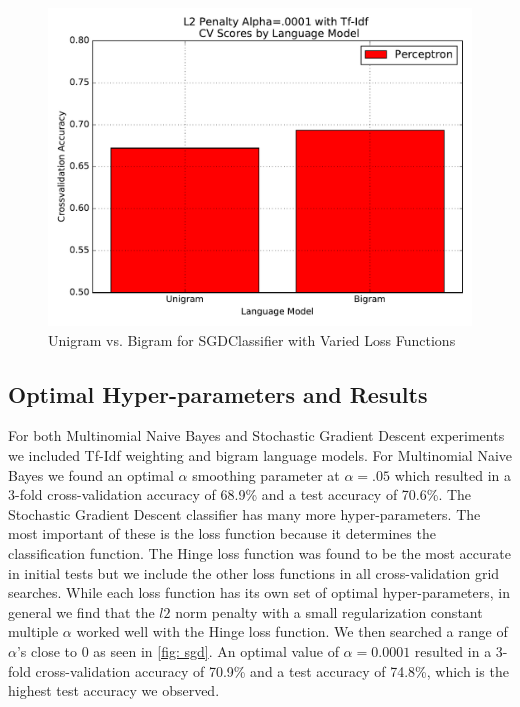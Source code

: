 \documentclass[a4paper, 12pt]{article}
\begin{document}
\begin{figure}[!htb]
  \includegraphics[width=\linewidth]{FiguresSVM_bigram_perceptron.pdf}
\endminipage
\caption[Unigram vs. Bigram for SGDClassifier with Varied Loss Functions]{Unigram vs. Bigram for SGDClassifier with Varied Loss Functions}
\label{fig: lm}
\end{figure}
\subsection{Optimal Hyper-parameters and Results}
For both Multinomial Naive Bayes and Stochastic Gradient Descent experiments we included Tf-Idf weighting and bigram language models. For Multinomial Naive Bayes we found an optimal $\alpha$ smoothing parameter at $\alpha=.05$ which resulted in a 3-fold cross-validation accuracy of 68.9\% and a test accuracy of 70.6\%. The Stochastic Gradient Descent classifier has many more hyper-parameters. The most important of these is the loss function because it determines the classification function. The Hinge loss function was found to be the most accurate in initial tests but we include the other loss functions in all cross-validation grid searches. While each loss function has its own set of optimal hyper-parameters, in general we find that the $l2$ norm penalty with a small regularization constant multiple $\alpha$ worked well with the Hinge loss function. We then searched a range of $\alpha$'s close to 0 as seen in \autoref{fig: sgd}. An optimal value of $\alpha=0.0001$ resulted in a 3-fold cross-validation accuracy of 70.9\% and a test accuracy of 74.8\%, which is the highest test accuracy we observed.
\end{document}
